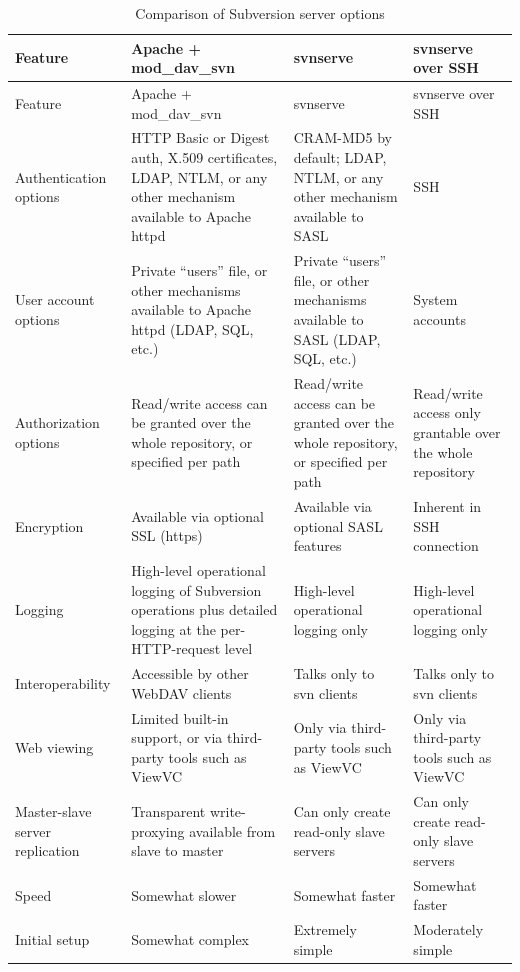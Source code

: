 \begin{longtable}[]{@{}>{\raggedright\arraybackslash}p{}>{\raggedright\arraybackslash}p{}>{\raggedright\arraybackslash}p{}>{\raggedright\arraybackslash}p{}@{}}
\caption{Comparison of Subversion server
options}\label{svn.serverconfig.overview.tbl-1}\tabularnewline
\toprule\noalign{}
Feature & Apache + mod\_dav\_svn & svnserve & svnserve over SSH \\
\midrule\noalign{}
\endfirsthead
\toprule\noalign{}
Feature & Apache + mod\_dav\_svn & svnserve & svnserve over SSH \\
\midrule\noalign{}
\endhead
\bottomrule\noalign{}
\endlastfoot
Authentication options & HTTP Basic or Digest auth, X.509 certificates,
LDAP, NTLM, or any other mechanism available to Apache httpd & CRAM-MD5
by default; LDAP, NTLM, or any other mechanism available to SASL &
SSH \\
User account options & Private ``users'' file, or other mechanisms
available to Apache httpd (LDAP, SQL, etc.) & Private ``users'' file, or
other mechanisms available to SASL (LDAP, SQL, etc.) & System
accounts \\
Authorization options & Read/write access can be granted over the whole
repository, or specified per path & Read/write access can be granted
over the whole repository, or specified per path & Read/write access
only grantable over the whole repository \\
Encryption & Available via optional SSL (https) & Available via optional
SASL features & Inherent in SSH connection \\
Logging & High-level operational logging of Subversion operations plus
detailed logging at the per-HTTP-request level & High-level operational
logging only & High-level operational logging only \\
Interoperability & Accessible by other WebDAV clients & Talks only to
svn clients & Talks only to svn clients \\
Web viewing & Limited built-in support, or via third-party tools such as
ViewVC & Only via third-party tools such as ViewVC & Only via
third-party tools such as ViewVC \\
Master-slave server replication & Transparent write-proxying available
from slave to master & Can only create read-only slave servers & Can
only create read-only slave servers \\
Speed & Somewhat slower & Somewhat faster & Somewhat faster \\
Initial setup & Somewhat complex & Extremely simple & Moderately
simple \\
\end{longtable}

